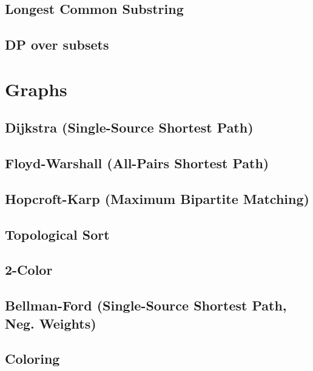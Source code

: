 \documentclass[10pt]{article}
\begin{document}
		\subsection{Longest Common Substring}
		
		
		\newpage
		\subsection{DP over subsets}
		
		
	\section{Graphs}
		\subsection{Dijkstra (Single-Source Shortest Path)}
		
			
		\subsection{Floyd-Warshall (All-Pairs Shortest Path)}
		
		
		\subsection{Hopcroft-Karp (Maximum Bipartite Matching)}
		
		
		\subsection{Topological Sort}
		
		
		\subsection{2-Color}
		
		
		\newpage
		\subsection{Bellman-Ford (Single-Source Shortest Path, Neg. Weights)}
		
		
		\newpage
		\subsection{Coloring}
		
		
\end{document}
